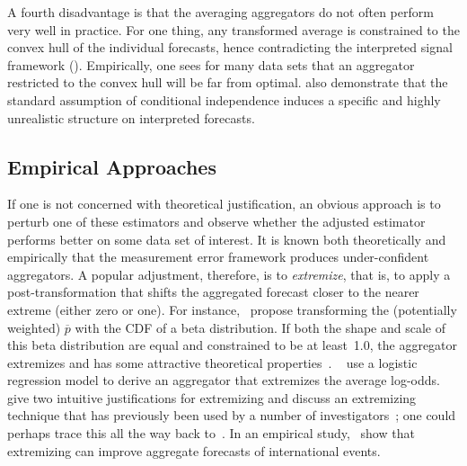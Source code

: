 \documentclass[11pt]{article}
\theoremstyle{definition}
\theoremstyle{definition}
\def\pb{\overline{p}}
\begin{document}
A fourth disadvantage is that the averaging aggregators do not often perform
very well in practice. For one thing, any transformed average is constrained to
the convex hull of the individual forecasts, hence contradicting the
interpreted signal framework (\citealt{parunak2013characterizing}).  Empirically, one sees
for many data sets that an aggregator restricted to the convex hull
will be far from optimal. \cite{hong2009interpreted} also demonstrate that the standard
assumption of conditional independence induces a specific and highly
unrealistic structure on interpreted forecasts.

\subsection{Empirical Approaches}
\label{ss:empirical}

If one is not concerned with theoretical justification, an obvious
approach is to perturb one of these estimators and observe whether the
adjusted estimator performs better on some data set of interest.  It
is known both theoretically and empirically that the measurement error
framework produces under-confident aggregators.  A popular adjustment,
therefore, is to {\em extremize}, that is, to apply a
post-transformation that shifts the aggregated forecast closer to the
nearer extreme (either zero or one).  For instance,~\citet{Ranjan08}
propose transforming the (potentially weighted) $\pb$ with the CDF of a
beta distribution.  If both the shape and scale of this beta
distribution are equal and constrained to be at least~1.0, the
aggregator extremizes and has some attractive theoretical
properties~\citep{Wallsten2001}.  ~\citet{satopaa} use a logistic
regression model to derive an aggregator that extremizes the average
log-odds.  ~\citet{baron2014two} give two intuitive justifications for
extremizing and discuss an extremizing technique that has previously
been used by a number of investigators~\citep{Erev1994,
shlomi2010subjective}; one could perhaps trace this all the way back
to~\citet{karmarkar1978subjectively}.  In an empirical
study,~\citet{mellers2014psychological} show that extremizing can
improve aggregate forecasts of international events.
\end{document}
